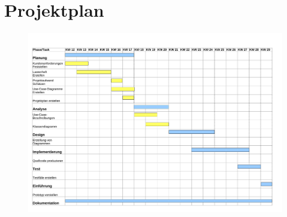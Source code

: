 \clearpage

\chapter{Projektplan}


\begin{figure}[!h]
	\centering
    \includegraphics[width=\textwidth]{./projektplan.pdf}
	\label{layout_gesamt}
\end{figure}


